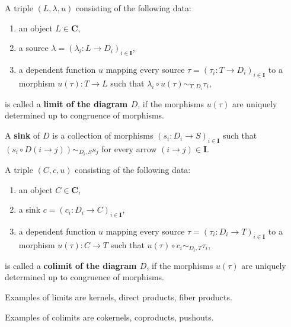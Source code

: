 \begin{definition}
 A triple $(L, \lambda, u)$ consisting of the following data:
 \begin{enumerate}
  \item an object $L \in \mathbf{C}$,
  \item a source $\lambda = ( \lambda_i: L \rightarrow D_i)_{i \in \mathbf{I}}$,
  \item a dependent function $u$ mapping every source $\tau = ( \tau_i: T \rightarrow D_i )_{i \in \mathbf{I}}$
        to a morphism $u( \tau ): T \rightarrow L$ such that
        $\lambda_i \circ u( \tau ) \sim_{T,D_i} \tau_i$,
 \end{enumerate}
 is called a \textbf{limit of the diagram $D$}, if the morphisms $u(\tau)$ are uniquely determined up to
 congruence of morphisms.
\end{definition}

\begin{definition}
 A \textbf{sink} of $D$ is a collection of morphisms $( s_i: D_i \rightarrow S )_{i \in \mathbf{I}}$
 such that $\left(s_i \circ D( i \rightarrow j )\right) \sim_{D_i, S} s_j$ for every arrow $(i \rightarrow j) \in \mathbf{I}$.
\end{definition}


\begin{definition}
 A triple $(C, c, u)$ consisting of the following data:
 \begin{enumerate}
  \item an object $C \in \mathbf{C}$,
  \item a sink $c = ( c_i: D_i \rightarrow C )_{i \in \mathbf{I}}$,
  \item a dependent function $u$ mapping every source $\tau = ( \tau_i: D_i \rightarrow T )_{i \in \mathbf{I}}$
        to a morphism $u( \tau ): C \rightarrow T$ such that
        $u(\tau) \circ c_{i} \sim_{D_i,T} \tau_i$,
 \end{enumerate}
 is called a \textbf{colimit of the diagram $D$}, if the morphisms $u(\tau)$ are uniquely determined up to
 congruence of morphisms.
\end{definition}

\begin{example}
 Examples of limits are kernels, direct products, fiber products.
\end{example}

\begin{example}
 Examples of colimits are cokernels, coproducts, pushouts.
\end{example}

